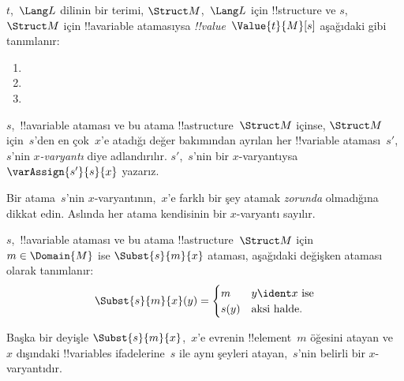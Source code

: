 \documentclass[../../../include/open-logic-section]{subfiles}
\begin{document}
\begin{defn}
$t$,~$\Lang L$ dilinin bir terimi, $\Struct M$,~$\Lang L$ için
!!{structure} ve $s$,~$\Struct M$ için !!a{variable} atamasıysa
\emph{!!{value}}~$\Value{t}{M}[s]$ aşağıdaki gibi tanımlanır:
\begin{enumerate}
\item {}
\item {}
\item {}
\end{enumerate}
\end{defn}

\begin{defn}[$x$-Varyantı]
$s$,~!!a{variable} ataması ve bu atama !!a{structure}~$\Struct M$
içinse,
$\Struct M$ için~$s$'den en çok~$x$'e atadığı değer bakımından ayrılan
her !!{variable} ataması~$s'$,~$s$'nin \emph{$x$-varyantı} diye
adlandırılır. $s'$,~$s$'nin bir $x$-varyantıysa
$\varAssign{s'}{s}{x}$ yazarız.
\end{defn}

\begin{explain}
Bir atama~$s$'nin $x$-varyantının,~$x$'e farklı bir şey atamak
\emph{zorunda} olmadığına dikkat edin. Aslında her atama kendisinin
bir $x$-varyantı sayılır.
\end{explain}

\begin{defn}
  $s$,~!!a{variable} ataması ve bu atama !!a{structure}~$\Struct M$ için
  $m \in \Domain{M}$ ise $\Subst{s}{m}{x}$ ataması, aşağıdaki değişken
  ataması olarak tanımlanır:
  \[\Subst{s}{m}{x}(y) = \begin{cases}
    m & \text{$y \ident x$ ise}\\
    s(y) & \text{aksi halde}.
  \end{cases}\]
\end{defn}

Başka bir deyişle $\Subst{s}{m}{x}$,~$x$'e evrenin
!!{element}~$m$ öğesini atayan ve~$x$ dışındaki !!{variable}s
ifadelerine~$s$ ile aynı şeyleri atayan,~$s$'nin belirli bir
$x$-varyantıdır.
\end{document}

